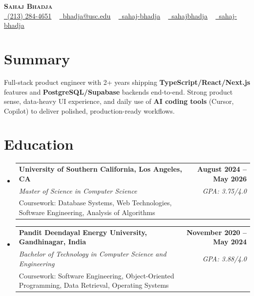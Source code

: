 \documentclass[letterpaper,10pt]{article}
\makeatletter
\newcommand{\resumeEduSubheading}[5]{\vspace{-1pt}\item\begin{tabular*}{1.0\textwidth}[t]{l@{\extracolsep{\fill}}r}\textbf{#1} & \textbf{\small #2} \\\textit{\small #3} & \textit{\small #4} \\\small #5 & \\\end{tabular*}\vspace{-4pt}}
\newcommand{\resumeSubHeadingListStart}{\begin{itemize}[leftmargin=0.0in, label={}]}
\newcommand{\resumeSubHeadingListEnd}{\end{itemize}}
\makeatother
\begin{document}
\begin{center}
{\Huge \scshape \textbf{Sahaj Bhadja}} \\ \vspace{1pt}
\small \href{tel:(213) 284-4651}{\faPhone\ \underline{(213) 284-4651}} ~ \href{mailto:bhadja@usc.edu}{\raisebox{-0.2\height}\faEnvelope\ \underline{bhadja@usc.edu}} ~
\href{https://www.linkedin.com/in/sahaj-bhadja/}{\raisebox{-0.2\height}\faLinkedin\ \underline{sahaj-bhadja}} ~ \href{https://github.com/SAHAJ-BHADJA}{\raisebox{-0.2\height}\faGithub\ \underline{sahajbhadja}} ~
\href{https://sahaj-bhadja.vercel.app/}{\raisebox{-0.2\height}\faGlobe\ \underline{sahaj-bhadja}}
\end{center}
\vspace{-18pt}
\section{Summary}
\begin{itemize}[leftmargin=0.15in, label={}]
\small{\item{Full-stack product engineer with 2+ years shipping \textbf{TypeScript/React/Next.js} features and \textbf{PostgreSQL/Supabase} backends end-to-end. Strong product sense, data-heavy UI experience, and daily use of \textbf{AI coding tools} (Cursor, Copilot) to deliver polished, production-ready workflows.}}
\end{itemize}
\vspace{-16pt}
\section{Education}
\resumeSubHeadingListStart
\resumeEduSubheading{University of Southern California, Los Angeles, CA}{August 2024 -- May 2026}{Master of Science in Computer Science}{GPA: 3.75/4.0}{Coursework: Database Systems, Web Technologies, Software Engineering, Analysis of Algorithms}
\vspace{-9pt}
\resumeEduSubheading{Pandit Deendayal Energy University, Gandhinagar, India}{November 2020 -- May 2024}{Bachelor of Technology in Computer Science and Engineering}{GPA: 3.88/4.0}{Coursework: Software Engineering, Object-Oriented Programming, Data Retrieval, Operating Systems}
\resumeSubHeadingListEnd
\vspace{-14pt}
\end{document}
